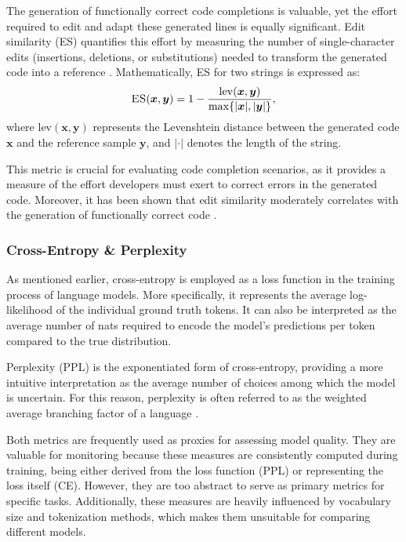 The generation of functionally correct code completions is valuable, yet the effort required to edit and adapt these generated lines is equally significant. Edit similarity (ES) quantifies this effort by measuring the number of single-character edits (insertions, deletions, or substitutions) needed to transform the generated code into a reference \parencite{svyatkovskiy2020}. Mathematically, ES for two strings is expressed as:
\begin{equation}
    \text{\textsc{ES}}(\bm{x}, \bm{y}) = 1 - \frac{\mathrm{lev}(\bm{x}, \bm{y})}{\max\{|\bm{x}|, |\bm{y}|\}},
\end{equation}
where \(\mathrm{lev}(\bm{x}, \bm{y})\) represents the Levenshtein distance between the generated code \(\bm{x}\) and the reference sample \(\bm{y}\), and \(|\cdot|\) denotes the length of the string.

This metric is crucial for evaluating code completion scenarios, as it provides a measure of the effort developers must exert to correct errors in the generated code. Moreover, it has been shown that edit similarity moderately correlates with the generation of functionally correct code \parencite{dibia2022}.

\subsubsection*{Cross-Entropy \& Perplexity}

As mentioned earlier, cross-entropy is employed as a loss function in the training process of language models. More specifically, it represents the average log-likelihood of the individual ground truth tokens. It can also be interpreted as the average number of nats required to encode the model's predictions per token compared to the true distribution.

Perplexity (PPL) is the exponentiated form of cross-entropy, providing a more intuitive interpretation as the average number of choices among which the model is uncertain. For this reason, perplexity is often referred to as the weighted average branching factor of a language \parencite{murphy2022}.

Both metrics are frequently used as proxies for assessing model quality. They are valuable for monitoring because these measures are consistently computed during training, being either derived from the loss function (PPL) or representing the loss itself (CE). However, they are too abstract to serve as primary metrics for specific tasks. Additionally, these measures are heavily influenced by vocabulary size and tokenization methods, which makes them unsuitable for comparing different models.

